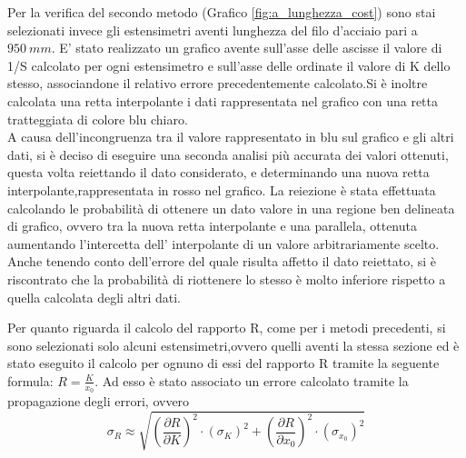 \documentclass[a4paper,11pt,oneside]{article}
\begin{document}
\begin{figure}[h!]
    \centering
\end{figure}
Per la verifica del secondo metodo (Grafico \ref{fig:a_lunghezza_cost}) sono stai selezionati invece gli estensimetri aventi lunghezza del filo d'acciaio pari a $\SI{950}{mm}$. E' stato realizzato un grafico avente sull'asse delle ascisse il valore di 1/S  calcolato per ogni estensimetro e sull'asse delle ordinate il valore di K dello stesso, associandone il relativo errore precedentemente calcolato.Si è inoltre calcolata una retta interpolante i dati rappresentata nel grafico con una retta tratteggiata di colore blu chiaro.\\
A causa dell'incongruenza tra il valore rappresentato in blu sul grafico e gli altri dati, si è deciso di eseguire una seconda analisi più accurata dei valori ottenuti, questa volta reiettando il dato considerato, e determinando una nuova retta interpolante,rappresentata in rosso nel grafico.
La reiezione è stata effettuata calcolando le probabilità di ottenere un dato valore in una regione ben delineata di grafico, ovvero tra la nuova retta interpolante e una parallela, ottenuta aumentando l'intercetta dell' interpolante di un valore arbitrariamente scelto. Anche tenendo conto dell'errore del quale risulta affetto il dato reiettato, si è riscontrato che la probabilità di riottenere lo stesso è molto inferiore rispetto a quella calcolata degli altri dati.


\begin{figure}[h!]
    \centering
\end{figure}



Per quanto riguarda il calcolo del rapporto R, come per i metodi precedenti, si sono selezionati solo alcuni estensimetri,ovvero quelli aventi la stessa sezione ed è stato eseguito il calcolo per ognuno di essi del rapporto R tramite la seguente formula: $R=\frac{K}{x_{0}}$. Ad esso è stato associato un errore calcolato tramite la propagazione degli errori, ovvero 
\begin{equation*}
    \sigma_R \approx \sqrt{\left ( \frac{\partial R }{\partial K} \right )^2 \cdot \left ( \sigma_K \right )^2 + \left ( \frac{\partial R }{\partial x_0} \right )^2 \cdot \left ( \sigma_{x_0} \right )^2 }
\end{equation*}
\end{document}
